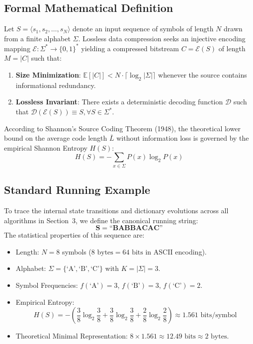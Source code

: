 \documentclass{article}
\begin{document}
\subsection{Formal Mathematical Definition}
Let $S = \langle s_1, s_2, \dots, s_N \rangle$ denote an input sequence of symbols of length $N$ drawn from a finite alphabet $\Sigma$. Lossless data compression seeks an injective encoding mapping $\mathcal{E}: \Sigma^* \to \{0, 1\}^*$ yielding a compressed bitstream $C = \mathcal{E}(S)$ of length $M = |C|$ such that:
\begin{enumerate}
    \item \textbf{Size Minimization}: $\mathbb{E}[|C|] < N \cdot \lceil \log_2 |\Sigma| \rceil$ whenever the source contains informational redundancy.
    \item \textbf{Lossless Invariant}: There exists a deterministic decoding function $\mathcal{D}$ such that $\mathcal{D}(\mathcal{E}(S)) \equiv S, \forall S \in \Sigma^*$.
\end{enumerate}

According to Shannon's Source Coding Theorem (1948), the theoretical lower bound on the average code length $\bar{L}$ without information loss is governed by the empirical Shannon Entropy $H(S)$:
\begin{equation}
    H(S) = -\sum_{x \in \Sigma} P(x) \log_2 P(x)
\end{equation}

\subsection{Standard Running Example}
To trace the internal state transitions and dictionary evolutions across all algorithms in Section~3, we define the canonical running string:
\begin{equation}
    \mathbf{S = \text{``BABBACAC''}}
\end{equation}
The statistical properties of this sequence are:
\begin{itemize}
    \item Length: $N = 8$ symbols ($8\text{ bytes} = 64\text{ bits}$ in ASCII encoding).
    \item Alphabet: $\Sigma = \{ \text{`A'}, \text{`B'}, \text{`C'} \}$ with $K = |\Sigma| = 3$.
    \item Symbol Frequencies: $f(\text{`A'}) = 3$, $f(\text{`B'}) = 3$, $f(\text{`C'}) = 2$.
    \item Empirical Entropy: 
    \begin{equation*}
        H(S) = -\left( \frac{3}{8}\log_2\frac{3}{8} + \frac{3}{8}\log_2\frac{3}{8} + \frac{2}{8}\log_2\frac{2}{8} \right) \approx 1.561\text{ bits/symbol}
    \end{equation*}
    \item Theoretical Minimal Representation: $8 \times 1.561 \approx 12.49\text{ bits} \approx 2\text{ bytes}$.
\end{itemize}
\end{document}
